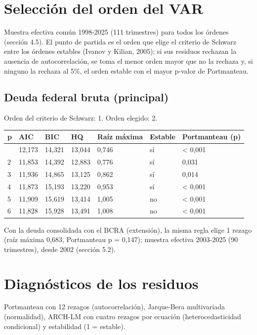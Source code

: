 \section{Selección del orden del VAR}

Muestra efectiva común 1998-2025 (111 trimestres) para todos los órdenes
(sección 4.5). El punto de partida es el orden que elige el criterio de
Schwarz entre los órdenes estables (Ivanov y Kilian, 2005); si sus
residuos rechazan la ausencia de autocorrelación, se toma el menor orden
mayor que no la rechaza y, si ninguno la rechaza al 5\%, el orden
estable con el mayor p-valor de Portmanteau.

\subsection{Deuda federal bruta (principal)}

Orden del criterio de Schwarz: 1. Orden elegido: 2.

\begin{longtable}[]{@{}lllllll@{}}
\toprule\noalign{}
p & AIC & BIC & HQ & Raíz máxima & Estable & Portmanteau (p) \\
\midrule\noalign{}
\endhead
\bottomrule\noalign{}
\endlastfoot
1 & 12,173 & 14,321 & 13,044 & 0,746 & sí & \textless{} 0,001 \\
2 & 11,853 & 14,392 & 12,883 & 0,776 & sí & 0,031 \\
3 & 11,936 & 14,865 & 13,125 & 0,862 & sí & 0,014 \\
4 & 11,873 & 15,193 & 13,220 & 0,953 & sí & \textless{} 0,001 \\
5 & 11,909 & 15,619 & 13,414 & 1,005 & no & \textless{} 0,001 \\
6 & 11,828 & 15,928 & 13,491 & 1,008 & no & \textless{} 0,001 \\
\end{longtable}

Con la deuda consolidada con el BCRA (extensión), la misma regla elige 1
rezago (raíz máxima 0,683, Portmanteau p = 0,147); muestra efectiva
2003-2025 (90 trimestres), desde 2002 (sección 5.2).

\section{Diagnósticos de los residuos}

Portmanteau con 12 rezagos (autocorrelación), Jarque-Bera multivariada
(normalidad), ARCH-LM con cuatro rezagos por ecuación
(heterocedasticidad condicional) y estabilidad (1 = estable).


